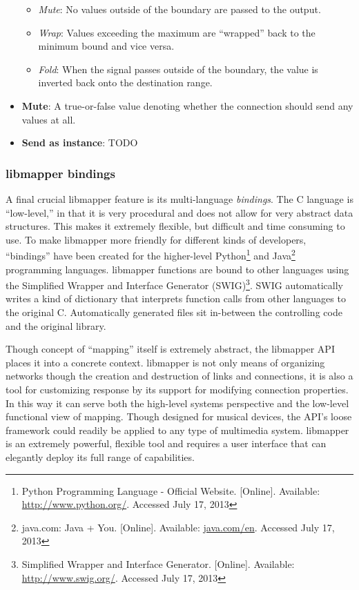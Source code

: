 \begin{itemize}
\begin{itemize}
		\item\emph{Mute}: No values outside of the boundary are passed to the output.
		\item\emph{Wrap}: Values exceeding the maximum are ``wrapped'' back to the minimum bound and vice versa.
		\item\emph{Fold}: When the signal passes outside of the boundary, the value is inverted back onto the destination range. 
	\end{itemize}
	\item\textbf{Mute}: A true-or-false value denoting whether the connection should send any values at all.
	\item\textbf{Send as instance}: TODO
\end{itemize}

	\subsubsection{libmapper bindings}

A final crucial libmapper feature is its multi-language \emph{bindings}. The C language is ``low-level,'' in that it is very procedural and does not allow for very abstract data structures. This makes it extremely flexible, but difficult and time consuming to use. To make libmapper more friendly for different kinds of developers, ``bindings'' have been created for the higher-level 
Python\footnote{Python Programming Language - Official Website. [Online]. Available: \url{http://www.python.org/}. Accessed July 17, 2013} 
and 
Java\footnote{java.com: Java + You. [Online]. Available: \url{java.com/en}. Accessed July 17, 2013} 
programming languages. libmapper functions are bound to other languages using the 
Simplified Wrapper and Interface Generator (SWIG)\footnote{Simplified Wrapper and Interface Generator. [Online]. Available: \url{http://www.swig.org/}. Accessed July 17, 2013}.
SWIG automatically writes a kind of dictionary that interprets function calls from other languages to the original C. Automatically generated files sit in-between the controlling code and the original library. 

Though concept of ``mapping'' itself is extremely abstract, the libmapper API places it into a concrete context. libmapper is not only means of organizing networks though the creation and destruction of links and connections, it is also a tool for customizing response by its support for modifying connection properties. In this way it can serve both the high-level systems perspective and the low-level functional view of mapping. Though designed for musical devices, the API's loose framework could readily be applied to any type of multimedia system. libmapper is an extremely powerful, flexible tool and requires a user interface that can elegantly deploy its full range of capabilities.

